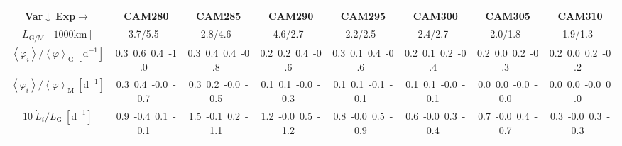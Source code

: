 \setlength\tabcolsep{1.5pt}

\begin{table}[H]
{\footnotesize
\begin{centering}
\begin{tabular}{|c|c|c|c|c|c|c|c|}
\hline
Var$\downarrow\ $Exp$\rightarrow$ & CAM280 & CAM285 & CAM290 & CAM295 & CAM300 & CAM305 & CAM310 \tabularnewline
\hline
\hline
$L_{\mathrm{G/M}}\ \left[1000\mathrm{km}\right]$ & 3.7/5.5\ & 2.8/4.6\ & 4.6/2.7\ & 2.2/2.5\ & 2.4/2.7\ & 2.0/1.8\ & 1.9/1.3\ \tabularnewline
\hline
$\left\langle \dot{\varphi}_{i}\right\rangle /\left\langle \varphi\right\rangle _{\mathrm{G}}\ \left[\mathrm{d^{-1}}\right]$ & \textcolor{C1}{0.3}\ \textcolor{C2}{0.6}\ \textcolor{C3}{0.4}\ \textcolor{C4}{-1.0}\  & \textcolor{C1}{0.3}\ \textcolor{C2}{0.4}\ \textcolor{C3}{0.4}\ \textcolor{C4}{-0.8}\  & \textcolor{C1}{0.2}\ \textcolor{C2}{0.2}\ \textcolor{C3}{0.4}\ \textcolor{C4}{-0.6}\  & \textcolor{C1}{0.3}\ \textcolor{C2}{0.1}\ \textcolor{C3}{0.4}\ \textcolor{C4}{-0.6}\  & \textcolor{C1}{0.2}\ \textcolor{C2}{0.1}\ \textcolor{C3}{0.2}\ \textcolor{C4}{-0.4}\  & \textcolor{C1}{0.2}\ \textcolor{C2}{0.0}\ \textcolor{C3}{0.2}\ \textcolor{C4}{-0.3}\  & \textcolor{C1}{0.2}\ \textcolor{C2}{0.0}\ \textcolor{C3}{0.2}\ \textcolor{C4}{-0.2}\  \tabularnewline
\hline
$\left\langle \dot{\varphi}_{i}\right\rangle /\left\langle \varphi\right\rangle _{\mathrm{M}}\ \left[\mathrm{d^{-1}}\right]$ & \textcolor{C1}{0.3}\ \textcolor{C2}{0.4}\ \textcolor{C3}{-0.0}\ \textcolor{C4}{-0.7}\  & \textcolor{C1}{0.3}\ \textcolor{C2}{0.2}\ \textcolor{C3}{-0.0}\ \textcolor{C4}{-0.5}\  & \textcolor{C1}{0.1}\ \textcolor{C2}{0.1}\ \textcolor{C3}{-0.0}\ \textcolor{C4}{-0.3}\  & \textcolor{C1}{0.1}\ \textcolor{C2}{0.1}\ \textcolor{C3}{-0.1}\ \textcolor{C4}{-0.1}\  & \textcolor{C1}{0.1}\ \textcolor{C2}{0.1}\ \textcolor{C3}{-0.0}\ \textcolor{C4}{-0.1}\  & \textcolor{C1}{0.0}\ \textcolor{C2}{0.0}\ \textcolor{C3}{-0.0}\ \textcolor{C4}{-0.0}\  & \textcolor{C1}{0.0}\ \textcolor{C2}{0.0}\ \textcolor{C3}{-0.0}\ \textcolor{C4}{0.0}\  \tabularnewline
\hline
$10\ \dot{L}_{i}/L_{\mathrm{G}}\ \left[\mathrm{d^{-1}}\right]$ & \textcolor{C1}{0.9}\ \textcolor{C2}{-0.4}\ \textcolor{C3}{0.1}\ \textcolor{C4}{-0.1}\  & \textcolor{C1}{1.5}\ \textcolor{C2}{-0.1}\ \textcolor{C3}{0.2}\ \textcolor{C4}{-1.1}\  & \textcolor{C1}{1.2}\ \textcolor{C2}{-0.0}\ \textcolor{C3}{0.5}\ \textcolor{C4}{-1.2}\  & \textcolor{C1}{0.8}\ \textcolor{C2}{-0.0}\ \textcolor{C3}{0.5}\ \textcolor{C4}{-0.9}\  & \textcolor{C1}{0.6}\ \textcolor{C2}{-0.0}\ \textcolor{C3}{0.3}\ \textcolor{C4}{-0.4}\  & \textcolor{C1}{0.7}\ \textcolor{C2}{-0.0}\ \textcolor{C3}{0.4}\ \textcolor{C4}{-0.7}\  & \textcolor{C1}{0.3}\ \textcolor{C2}{-0.0}\ \textcolor{C3}{0.3}\ \textcolor{C4}{-0.3}\  \tabularnewline

\end{tabular}
\end{centering}}
\end{table}
